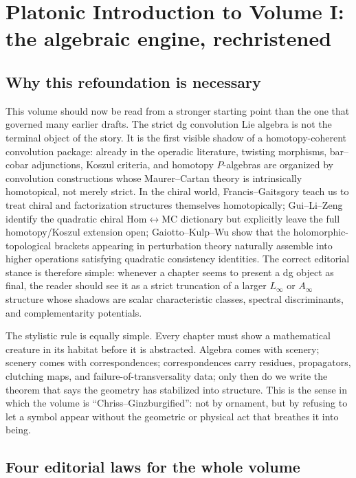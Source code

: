 
\chapter*{Platonic Introduction to Volume I: the algebraic engine, rechristened}

\section*{Why this refoundation is necessary}

This volume should now be read from a stronger starting point than the one that governed many earlier drafts.  The strict dg convolution Lie algebra is not the terminal object of the story.  It is the first visible shadow of a homotopy-coherent convolution package: already in the operadic literature, twisting morphisms, bar--cobar adjunctions, Koszul criteria, and homotopy $P$-algebras are organized by convolution constructions whose Maurer--Cartan theory is intrinsically homotopical, not merely strict.  In the chiral world, Francis--Gaitsgory teach us to treat chiral and factorization structures themselves homotopically; Gui--Li--Zeng identify the quadratic chiral Hom$\leftrightarrow$MC dictionary but explicitly leave the full homotopy/Koszul extension open; Gaiotto--Kulp--Wu show that the holomorphic-topological brackets appearing in perturbation theory naturally assemble into higher operations satisfying quadratic consistency identities.  The correct editorial stance is therefore simple: whenever a chapter seems to present a dg object as final, the reader should see it as a strict truncation of a larger $L_\infty$ or $A_\infty$ structure whose shadows are scalar characteristic classes, spectral discriminants, and complementarity potentials.

The stylistic rule is equally simple.  Every chapter must show a mathematical creature in its habitat before it is abstracted.  Algebra comes with scenery; scenery comes with correspondences; correspondences carry residues, propagators, clutching maps, and failure-of-transversality data; only then do we write the theorem that says the geometry has stabilized into structure.  This is the sense in which the volume is ``Chriss--Ginzburgified'': not by ornament, but by refusing to let a symbol appear without the geometric or physical act that breathes it into being.

\section*{Four editorial laws for the whole volume}

